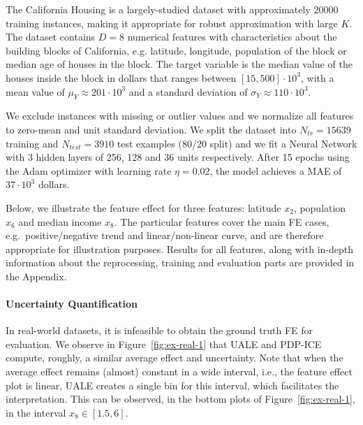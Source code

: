 \documentclass[twoside]{article}
\begin{document}
The California Housing is a largely-studied dataset with approximately
\(20000\) training instances, making it appropriate for robust
approximation with large \(K\). The dataset contains \(D=8\) numerical
features with characteristics about the building blocks of California,
e.g. latitude, longitude, population of the block or median age of
houses in the block. The target variable is the median value of the
houses inside the block in dollars that ranges between
\([15, 500] \cdot 10^3\), with a mean value of
\(\mu_Y \approx 201 \cdot 10^3 \) and a standard deviation of
\(\sigma_Y \approx 110 \cdot 10^3\).

We exclude instances with missing or outlier values and we normalize
all features to zero-mean and unit standard deviation. We split the
dataset into \(N_{tr} = 15639\) training and \(N_{test} = 3910\) test
examples (80/20 split) and we fit a Neural Network with 3 hidden
layers of 256, 128 and 36 units respectively. After 15 epochs using
the Adam optimizer with learning rate \(\eta = 0.02\), the model
achieves a MAE of \(37 \cdot 10^3\) dollars.

Below, we illustrate the feature effect for three features: latitude
\(x_2\), population \(x_6\) and median income \(x_8\). The particular
features cover the main FE cases, e.g.~positive/negative trend and
linear/non-linear curve, and are therefore appropriate for
illustration purposes. Results for all features, along with in-depth
information about the reprocessing, training and evaluation parts are
provided in the Appendix.

\paragraph{Uncertainty Quantification}

In real-world datasets, it is infeasible to obtain the ground truth FE
for evaluation. We observe in Figure~\ref{fig:ex-real-1} that UALE and
PDP-ICE compute, roughly, a similar average effect and
uncertainty. Note that when the average effect remains (almost)
constant in a wide interval, i.e., the feature effect plot is linear,
UALE creates a single bin for this interval, which facilitates the
interpretation. This can be observed, in the bottom plots of
Figure~\ref{fig:ex-real-1}, in the interval \(x_8 \in [1.5, 6]\).
\end{document}

